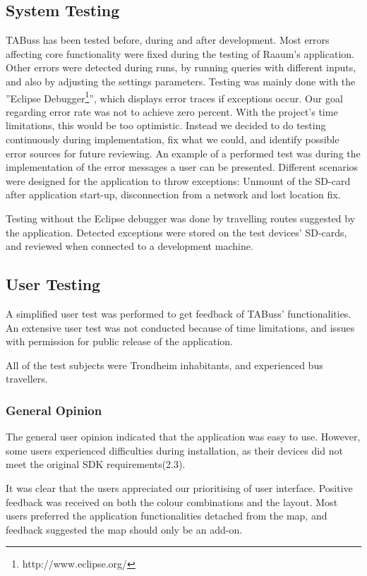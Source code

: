 \subsection{System Testing}
TABuss has been tested before, during and after development. Most errors affecting core functionality were fixed during the testing of Raaum's application. Other errors were detected during runs, by running queries with different inputs, and also by adjusting the settings parameters. Testing was mainly done with the ''Eclipse Debugger\footnote{http://www.eclipse.org/}'', which displays error traces if exceptions occur. Our goal regarding error rate was not to achieve zero percent. With the project's time limitations, this would be too optimistic. Instead we decided to do testing continuously during implementation, fix what we could, and identify possible error sources for future reviewing. An example of a performed test was during the implementation of the error messages a user can be presented. Different scenarios were designed for the application to throw exceptions: Unmount of the SD-card after application start-up, disconnection from a network and lost location fix.

Testing without the Eclipse debugger was done by travelling routes suggested by the application. Detected exceptions were stored on the test devices' SD-cards, and reviewed when connected to a development machine.

\subsection{User Testing}
A simplified user test was performed to get feedback of TABuss' functionalities. An extensive user test was not conducted because of time limitations, and issues with permission for public release of the application. 

All of the test subjects were Trondheim inhabitants, and  experienced bus travellers.

\subsubsection{General Opinion}
The general user opinion indicated that the application was easy to use. However, some users experienced difficulties during installation, as their devices did not meet the original SDK requirements(2.3). 

It was clear that the users appreciated our prioritising of user interface. Positive feedback was received on both the colour combinations and the layout. Most users preferred the application functionalities detached from the map, and feedback suggested the map should only be an add-on.


